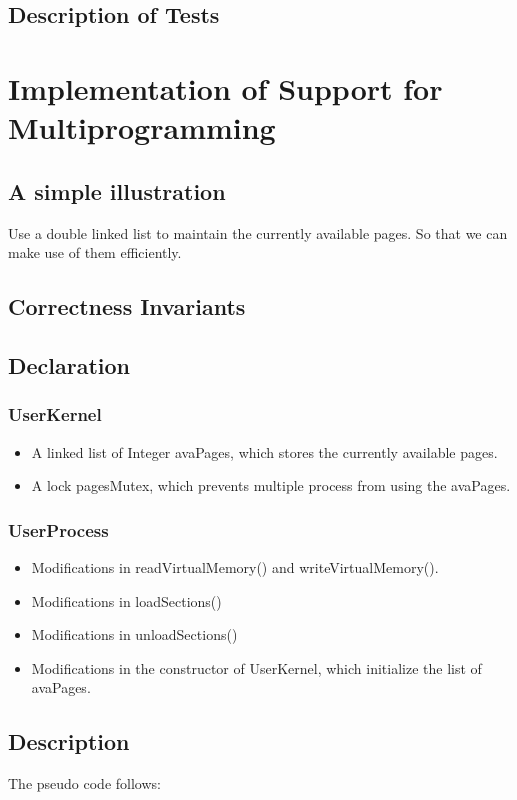 \documentclass{article}
\begin{document}
	\subsection{Description of Tests}
	\section{Implementation of Support for Multiprogramming}
	\subsection{A simple illustration}
	Use a double linked list to maintain the currently available pages. So that we can make use of them efficiently.
	\subsection{Correctness Invariants}
	\subsection{Declaration}
	\subsubsection*{UserKernel}
	\begin{itemize}
		\item A linked list of Integer avaPages, which stores the currently available pages.
		\item A lock pagesMutex, which prevents multiple process from using the avaPages.
	\end{itemize}
	\subsubsection*{UserProcess}
	\begin{itemize}
		\item Modifications in readVirtualMemory() and writeVirtualMemory().
		\item Modifications in loadSections()
		\item Modifications in unloadSections()
		\item Modifications in the constructor of UserKernel, which initialize the list of avaPages.
	\end{itemize}
	
	\subsection{Description}
	The pseudo code follows:
\end{document}
